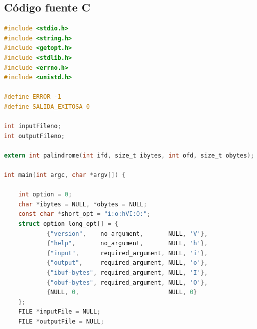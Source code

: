 \documentclass[a4paper]{article}
\begin{document}
\subsection{Código fuente C}
\begin{lstlisting}[language=C]
#include <stdio.h>
#include <string.h>
#include <getopt.h>
#include <stdlib.h>
#include <errno.h>
#include <unistd.h>

#define ERROR -1
#define SALIDA_EXITOSA 0

int inputFileno;
int outputFileno;

extern int palindrome(int ifd, size_t ibytes, int ofd, size_t obytes);

int main(int argc, char *argv[]) {

    int option = 0;
    char *ibytes = NULL, *obytes = NULL;
    const char *short_opt = "i:o:hVI:O:";
    struct option long_opt[] = {
            {"version",    no_argument,       NULL, 'V'},
            {"help",       no_argument,       NULL, 'h'},
            {"input",      required_argument, NULL, 'i'},
            {"output",     required_argument, NULL, 'o'},
            {"ibuf-bytes", required_argument, NULL, 'I'},
            {"obuf-bytes", required_argument, NULL, 'O'},
            {NULL, 0,                         NULL, 0}
    };
    FILE *inputFile = NULL;
    FILE *outputFile = NULL;


\end{lstlisting}
\end{document}
